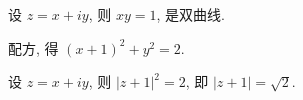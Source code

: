 \documentclass{homework}
\begin{document}

设 \(z=x+iy\), 则 \(xy=1\), 是双曲线.

配方, 得 \((x+1)^2+y^2=2\).

设 \(z=x+iy\), 则 \(|z+1|^2=2\), 即 \(|z+1|=\sqrt{2}\).

\end{document}
